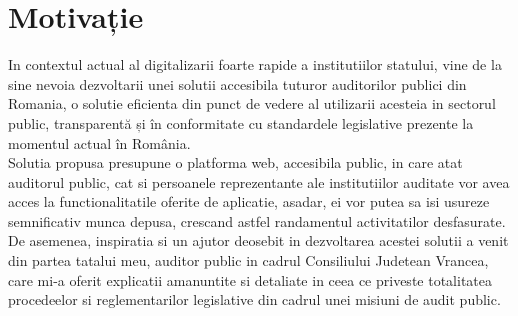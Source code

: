 \chapter*{Motivație} 

In contextul actual al digitalizarii foarte rapide a institutiilor statului, vine de la sine nevoia 
dezvoltarii unei solutii accesibila tuturor auditorilor publici din Romania, o solutie eficienta din punct de vedere al utilizarii acesteia in sectorul public, transparentă și în conformitate cu standardele legislative prezente la momentul actual în România.\\
Solutia propusa presupune o platforma web, accesibila public, in care atat auditorul public, cat si persoanele reprezentante ale institutiilor auditate vor avea acces la functionalitatile oferite de aplicatie, asadar, ei vor putea sa isi usureze semnificativ munca depusa, crescand astfel randamentul activitatilor desfasurate.\\
De asemenea, inspiratia si un ajutor deosebit in dezvoltarea acestei solutii a venit din partea tatalui meu, auditor public in cadrul Consiliului Judetean Vrancea, care mi-a oferit explicatii amanuntite si detaliate in ceea ce priveste totalitatea procedeelor si reglementarilor legislative din cadrul unei misiuni de audit public.\\